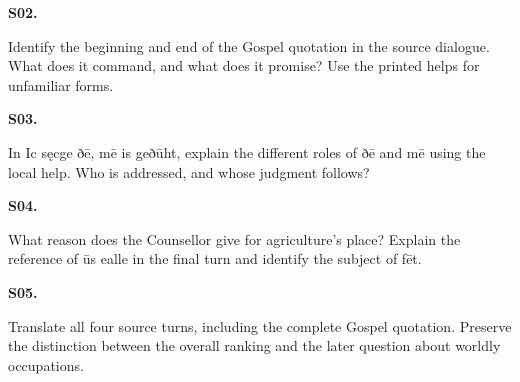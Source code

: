\par\begin{minipage}{\linewidth}\raggedright
\textbf{S02.}

Identify the beginning and end of the Gospel quotation in the source dialogue. What does it command, and what does it promise? Use the printed helps for unfamiliar forms.

\end{minipage}\par\addvspace{4pt}

\par\begin{minipage}{\linewidth}\raggedright
\textbf{S03.}

In Ic sęcge ðē, mē is geðūht, explain the different roles of ðē and mē using the local help. Who is addressed, and whose judgment follows?

\end{minipage}\par\addvspace{4pt}

\par\begin{minipage}{\linewidth}\raggedright
\textbf{S04.}

What reason does the Counsellor give for agriculture's place? Explain the reference of ūs ealle in the final turn and identify the subject of fēt.

\end{minipage}\par\addvspace{4pt}

\par\begin{minipage}{\linewidth}\raggedright
\textbf{S05.}

Translate all four source turns, including the complete Gospel quotation. Preserve the distinction between the overall ranking and the later question about worldly occupations.

\end{minipage}\par\addvspace{4pt}

